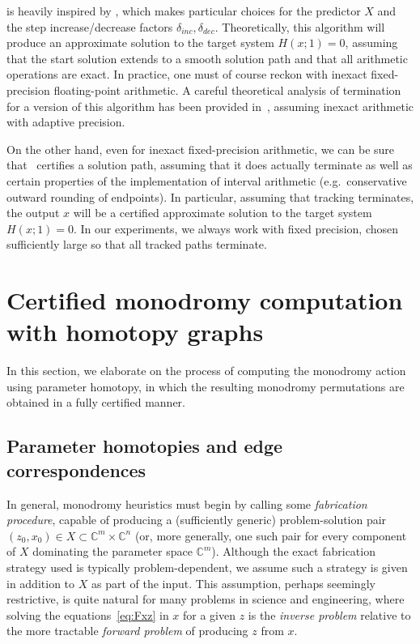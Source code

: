 \documentclass[11pt]{amsart}
\let\oldtextit\textit
\renewcommand\emph[1]{\oldtextit{\color{blue}#1}}
\theoremstyle{definition}
\theoremstyle{remark}
\begin{document}
\begin{enumerate}
 is heavily inspired by \cite[Algorithm 4]{guillemot2024validated}, which makes particular choices for the predictor $X$ and the step increase/decrease factors $\delta_{inc}, \delta_{dec}.$
Theoretically, this algorithm will produce an approximate solution to the target system $H(x;1)=0$, assuming that the start solution extends to a smooth solution path and that all arithmetic operations are exact.
In practice, one must of course reckon with inexact fixed-precision floating-point arithmetic.
A careful theoretical analysis of termination for a version of this algorithm has been provided in~\cite[Section 6.3]{guillemot2024validated}, assuming inexact arithmetic with adaptive precision.

On the other hand, even for inexact fixed-precision arithmetic, we can be sure that~ certifies a solution path, assuming that it does actually terminate as well as certain properties of the implementation of interval arithmetic (e.g.~conservative outward rounding of endpoints).
In particular, assuming that tracking terminates, the output $x$ will be a certified approximate solution to the target system $H(x;1)=0$.
In our experiments, we always work with fixed precision, chosen sufficiently large so that all tracked paths terminate.
\end{enumerate}



\section{Certified monodromy computation with homotopy graphs}\label{sec:homotopy-graph}

In this section, we elaborate on the process of computing the monodromy action using parameter homotopy, in which the resulting monodromy permutations are obtained in a fully certified manner.

\subsection{Parameter homotopies and edge correspondences}

In general, monodromy heuristics must begin by calling some \emph{fabrication procedure}, capable of producing a (sufficiently generic) problem-solution pair $(z_0, x_0) \in X\subset \mathbb{C}^m\times \mathbb{C}^n$ (or, more generally, one such pair for every component of $X$ dominating the parameter space $\mathbb{C}^m$). 
Although the exact fabrication strategy used is typically problem-dependent, we assume such a strategy is given in addition to $X$ as part of the input.
This assumption, perhaps seemingly restrictive, is quite natural for many problems in science and engineering, where solving the equations~\eqref{eq:Fxz} in $x$ for a given $z$ is the \emph{inverse problem} relative to the more tractable \emph{forward problem} of producing $z$ from $x.$
\end{document}
